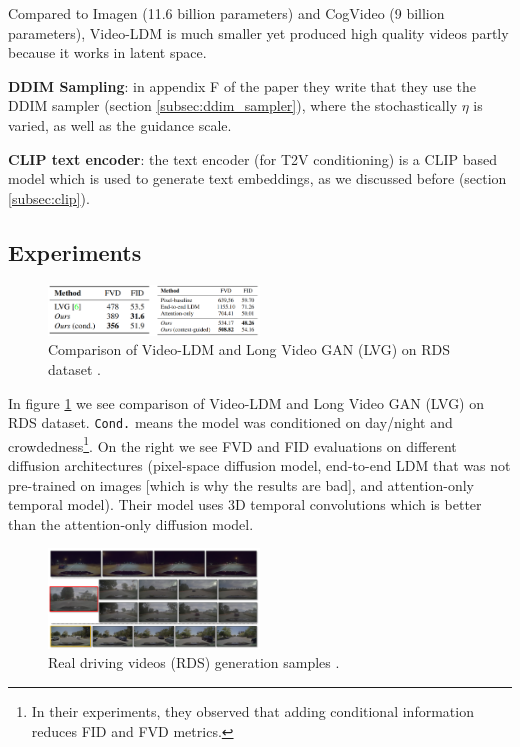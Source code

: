 Compared to Imagen (11.6 billion parameters) and CogVideo (9 billion parameters), Video-LDM is much smaller yet produced high quality videos partly because it works in latent space.

\textbf{DDIM Sampling}: in appendix F of the paper they write that they use the DDIM sampler \cite{ddim} (section \ref{subsec:ddim_sampler}), where the stochastically $\eta$ is varied, as well as the guidance scale.

\textbf{CLIP text encoder}: the text encoder (for T2V conditioning) is a CLIP \cite{openai_clip} based model which is used to generate text embeddings, as we discussed before (section \ref{subsec:clip}).










\subsection{Experiments}

\begin{figure}
    \centering
    \includegraphics[width=0.5\textwidth]{images/video_ldm/videoldm_vs_lvg_on_rds.png}
    \caption{Comparison of Video-LDM and Long Video GAN (LVG) on RDS dataset \cite{video_ldm}.}
    \label{fig:video_ldm_vs_lvg_on_rds}
\end{figure}

In figure \ref{fig:video_ldm_vs_lvg_on_rds} we see comparison of Video-LDM and Long Video GAN (LVG) on RDS dataset. \texttt{Cond.} means the model was conditioned on day/night and crowdedness\footnote{In their experiments, they observed that adding conditional information reduces FID and FVD metrics.}. On the right we see FVD and FID evaluations on different diffusion architectures (pixel-space diffusion model, end-to-end LDM that was not pre-trained on images [which is why the results are bad], and attention-only temporal model). Their model uses 3D temporal convolutions which is better than the attention-only diffusion model.

\begin{figure}
    \centering
    \includegraphics[width=0.5\textwidth]{images/video_ldm/rds.png}
    \caption{Real driving videos (RDS) generation samples \cite{video_ldm}.}
    \label{fig:video_ldm_rds}
\end{figure}

